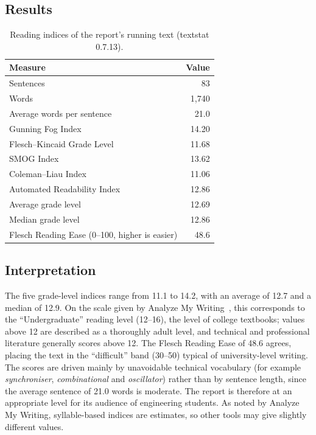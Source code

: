\documentclass[12pt,a4paper,twoside]{article}
\begin{document}
\subsection{Results}

\begin{table}[H]
\centering
\caption{Reading indices of the report's running text (textstat 0.7.13).}
\label{tab:readability}
\begin{tabular}{@{}lr@{}}
\toprule
\textbf{Measure} & \textbf{Value} \\
\midrule
Sentences                    & 83 \\
Words                        & 1,740 \\
Average words per sentence   & 21.0 \\
\midrule
Gunning Fog Index            & 14.20 \\
Flesch--Kincaid Grade Level  & 11.68 \\
SMOG Index                   & 13.62 \\
Coleman--Liau Index          & 11.06 \\
Automated Readability Index  & 12.86 \\
\midrule
Average grade level          & 12.69 \\
Median grade level           & 12.86 \\
\midrule
Flesch Reading Ease (0--100, higher is easier) & 48.6 \\
\bottomrule
\end{tabular}
\end{table}

\subsection{Interpretation}

The five grade-level indices range from 11.1 to 14.2, with an average of 12.7 and a
median of 12.9. On the scale given by Analyze My Writing~\cite{amw}, this
corresponds to the ``Undergraduate'' reading level (12--16), the level of college
textbooks; values above 12 are described as a thoroughly adult level, and
technical and professional literature generally scores above 12. The Flesch
Reading Ease of 48.6 agrees, placing the text in the ``difficult'' band (30--50)
typical of university-level writing. The scores are driven mainly by unavoidable
technical vocabulary (for example \emph{synchroniser}, \emph{combinational} and
\emph{oscillator}) rather than by sentence length, since the average sentence of
21.0 words is moderate. The report is therefore at an appropriate level for its
audience of engineering students. As noted by Analyze My Writing, syllable-based
indices are estimates, so other tools may give slightly different values.
\end{document}
